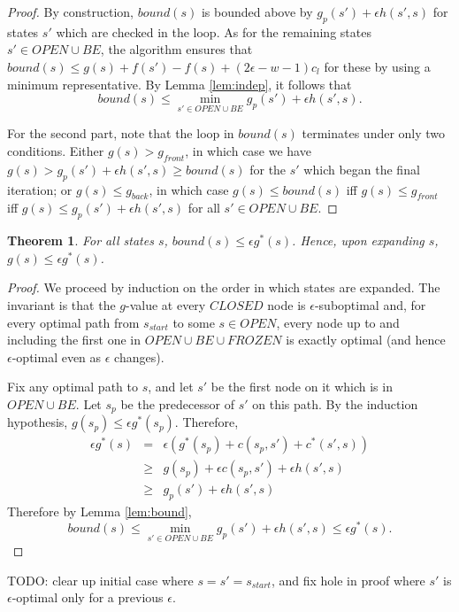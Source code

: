 \documentclass[letterpaper]{article}
\newtheorem{thm}{Theorem}
\begin{document}
\begin{proof}
By construction, $bound(s)$ is bounded above by $g_p(s') + \epsilon h(s',s)$ for states $s'$ which are checked in the loop. As for the remaining states $s' \in OPEN \cup BE$, the algorithm ensures that $bound(s) \le g(s) + f(s') - f(s) + (2\epsilon-w-1) c_l$ for these by using a minimum representative. By Lemma \ref{lem:indep}, it follows that
\[bound(s) \le \min_{s' \in OPEN \cup BE} g_p(s') + \epsilon h(s',s).\]

For the second part, note that the loop in $bound(s)$ terminates under only two conditions. Either $g(s) > g_{front}$, in which case we have $g(s) > g_p(s') + \epsilon h(s',s) \ge bound(s)$ for the $s'$ which began the final iteration; or $g(s) \le g_{back}$, in which case $g(s) \le bound(s)$ iff $g(s) \le g_{front}$ iff $g(s) \le g_p(s') + \epsilon h(s',s)$ for all $s' \in OPEN \cup BE$.
\end{proof}

\begin{thm}
\label{thm:subopt}
For all states $s$, $bound(s) \le \epsilon g^*(s)$. Hence, upon expanding $s$, $g(s) \le \epsilon g^*(s)$.
\end{thm}

\begin{proof}
We proceed by induction on the order in which states are expanded. The invariant is that the $g$-value at every $CLOSED$ node is $\epsilon$-suboptimal and, for every optimal path from $s_{start}$ to some $s\in OPEN$, every node up to and including the first one in $OPEN \cup BE \cup FROZEN$ is exactly optimal (and hence $\epsilon$-optimal even as $\epsilon$ changes).

Fix any optimal path to $s$, and let $s'$ be the first node on it which is in $OPEN \cup BE$. Let $s_p$ be the predecessor of $s'$ on this path. By the induction hypothesis, $g(s_p) \le \epsilon g^*(s_p)$. Therefore,
\begin{eqnarray*}
\epsilon g^*(s)&=& \epsilon\left(g^*(s_p) + c(s_p,s') + c^*(s',s)\right)
\\&\ge& g(s_p) + \epsilon c(s_p,s') + \epsilon h(s',s)
\\&\ge& g_p(s') + \epsilon h(s',s)
\end{eqnarray*}
Therefore by Lemma \ref{lem:bound},
\[bound(s) \le \min_{s' \in OPEN \cup BE} g_p(s') + \epsilon h(s',s) \le \epsilon g^*(s).\]
\end{proof}

TODO: clear up initial case where $s = s' = s_{start}$, and fix hole in proof where $s'$ is $\epsilon$-optimal only for a previous $\epsilon$.
\end{document}
